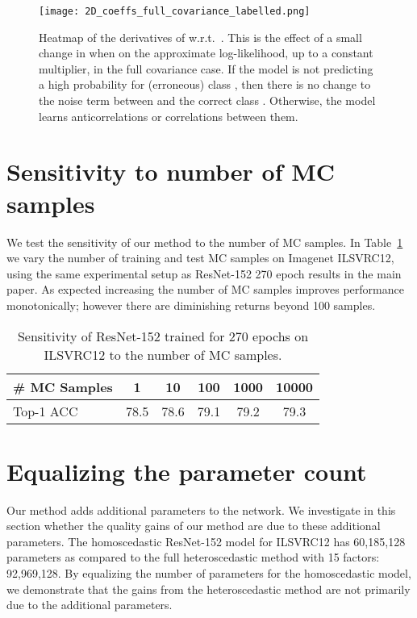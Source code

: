 \documentclass[final]{cvpr}
\begin{document}
\begin{figure}[t]
    \centering
    \texttt{[image: 2D\_coeffs\_full\_covariance\_labelled.png]}
    \caption{Heatmap of the derivatives of  w.r.t.\ . This is the effect of a small change in  when  on the approximate log-likelihood, up to a constant multiplier, in the full covariance case. If the model is not predicting a high probability for (erroneous) class , then there is no change to the noise term between  and the correct class . Otherwise, the model learns anticorrelations or correlations between them.}
    \label{fig:2d_coeffs_full_covariance}
\end{figure}

\section{Sensitivity to number of MC samples}
\label{app:mc_samples_sensitivity}

We test the sensitivity of our method to the number of MC samples. In Table~\ref{table:mc_sensitivty} we vary the number of training and test MC samples on Imagenet ILSVRC12, using the same experimental setup as ResNet-152 270 epoch results in the main paper. As expected increasing the number of MC samples improves performance monotonically; however there are diminishing returns beyond 100 samples.

\begin{table}[tbh]
\centering
\begin{tabular}{l|ccccc}
\toprule
\# MC Samples & 1 & 10 & 100 & 1000 & 10000 \\
\midrule
Top-1 ACC & 78.5 & 78.6 & 79.1 & 79.2 & 79.3 \\
\bottomrule
\end{tabular}
\caption{Sensitivity of ResNet-152 trained for 270 epochs on ILSVRC12 to the number of MC samples.}
\label{table:mc_sensitivty}
\end{table}

\section{Equalizing the parameter count}
\label{app:equal_params}

Our method adds additional parameters to the network. We investigate in this section whether the quality gains of our method are due to these additional parameters. The homoscedastic ResNet-152 model for ILSVRC12 has 60,185,128 parameters as compared to the full heteroscedastic method with 15 factors: 92,969,128. By equalizing the number of parameters for the homoscedastic model, we demonstrate that the gains from the heteroscedastic method are not primarily due to the additional parameters.
\end{document}

